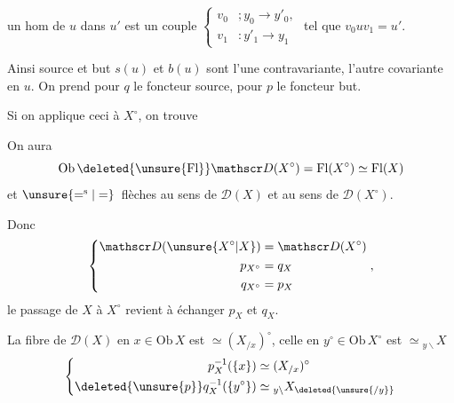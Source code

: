 un hom de $u$ dans $u'$ est un couple $\left\{\begin{aligned}v_0&;y_0\to y'_0,\\v_1&:y'_1\to y_1\end{aligned}\right.$ tel que $v_0 u v_1=u'$.

Ainsi source et but $s(u)$ et $b(u)$ sont l'une contravariante, l'autre covariante en $u$. On prend pour $q$ le foncteur source, pour $p$ le foncteur but.

Si on applique ceci à $X^\circ$, on trouve

On aura
\[
\mathrm{Ob}\,\deleted{\unsure{\mathrm{Fl}}}\mathscr D(X^\circ)=\mathrm{Fl}(X^\circ)\simeq\mathrm{Fl}(X)
\]
et $\unsure{=^{\mathrm s}|=}\,$ flèches au sens de $\mathscr D(X)$ et au sens de $\mathscr D(X^\circ)$.

Donc
\[
\left\{\begin{aligned}
\mathscr D(\unsure{X^\circ|X})&=\mathscr D(X^\circ)\\
p_{X^\circ}&=q_X\\
q_{X^\circ}&=p_X
\end{aligned}\right.,
\]
le passage de $X$ à $X^\circ$ revient à échanger $p_X$ et $q_X$.

La fibre de $\mathscr D(X)$ en $x\in\mathrm{Ob}\,X$ est $\simeq(X_{/x})^\circ$, celle en $y^\circ\in\mathrm{Ob}\,X^\circ$ est $\simeq {}_{y\backslash}X$
\[
\left\{\begin{aligned}
p_X^{-1}(\{x\})&\simeq(X_{/x})^\circ\\
\deleted{\unsure{p}}q_X^{-1}(\{y^\circ\})&\simeq {}_{y\backslash}X_{\deleted{\unsure{/y}}}
\end{aligned}\right.
\]


